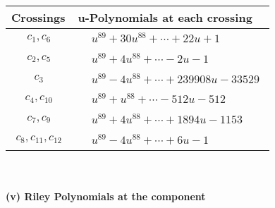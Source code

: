 \documentclass[1p]{elsarticle_modified}
\theoremstyle{definition}
\begin{document}
\begin{tabular}{m{50pt}|m{274pt}}
Crossings & \hspace{64pt}u-Polynomials at each crossing \\
\hline $$\begin{aligned}c_{1},c_{6}\end{aligned}$$&$\begin{aligned}
&u^{89}+30 u^{88}+\cdots+22 u+1
\end{aligned}$\\
\hline $$\begin{aligned}c_{2},c_{5}\end{aligned}$$&$\begin{aligned}
&u^{89}+4 u^{88}+\cdots-2 u-1
\end{aligned}$\\
\hline $$\begin{aligned}c_{3}\end{aligned}$$&$\begin{aligned}
&u^{89}-4 u^{88}+\cdots+239908 u-33529
\end{aligned}$\\
\hline $$\begin{aligned}c_{4},c_{10}\end{aligned}$$&$\begin{aligned}
&u^{89}+u^{88}+\cdots-512 u-512
\end{aligned}$\\
\hline $$\begin{aligned}c_{7},c_{9}\end{aligned}$$&$\begin{aligned}
&u^{89}+4 u^{88}+\cdots+1894 u-1153
\end{aligned}$\\
\hline $$\begin{aligned}c_{8},c_{11},c_{12}\end{aligned}$$&$\begin{aligned}
&u^{89}-4 u^{88}+\cdots+6 u-1
\end{aligned}$\\
\hline
\end{tabular}\\~\\
\newpage\renewcommand{\arraystretch}{1}
\flushleft \textbf{(v) Riley Polynomials at the component}\newline \\
\end{document}
